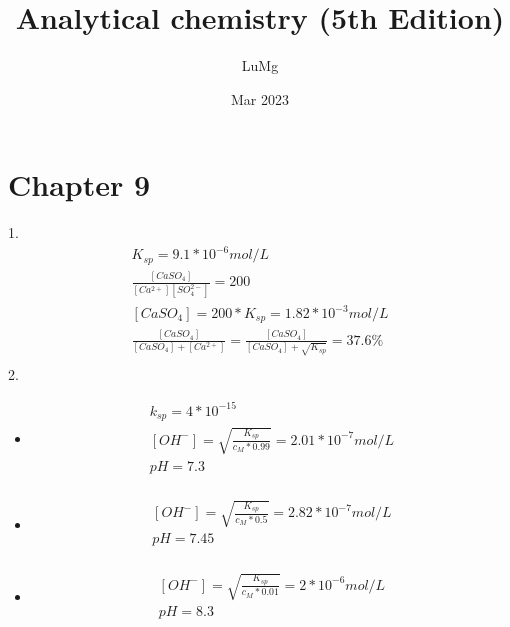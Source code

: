 \documentclass{article}
\title{Analytical chemistry (5th Edition)}
\author{LuMg}
\date{Mar 2023}
\begin{document}
\maketitle

\section{Chapter 9}
1.\begin{equation}
    \begin{multlined}
        K_{sp} = 9.1*10^{-6} mol/L\\
        \frac{[CaSO_4]}{[Ca^{2+}][SO_4^{2-}]} = 200\\
        [CaSO_4] = 200*K_{sp} = 1.82*10^{-3} mol/L\\
        \frac{[CaSO_4]}{[CaSO_4]+[Ca^{2+}]} = \frac{[CaSO_4]}{[CaSO_4] + \sqrt{K_{sp}}} = 37.6\%\\
    \end{multlined}
\end{equation}
2.\begin{itemize}
    \item
    \begin{equation}
        \begin{multlined}
            k_{sp} = 4*10^{-15}\\
            [OH^-]=\sqrt{\frac{K_{sp}}{c_M*0.99}} = 2.01*10^{-7} mol/L\\
            pH = 7.3\\
        \end{multlined}
    \end{equation}
    \item
    \begin{equation}
        \begin{multlined}
            [OH^-] = \sqrt{\frac{K_{sp}}{c_M*0.5}} = 2.82*10^{-7} mol/L\\
            pH = 7.45\\
        \end{multlined}
    \end{equation}
    \item
    \begin{equation}
        \begin{multlined}
            [OH^-] = \sqrt{\frac{K_{sp}}{c_M*0.01}} = 2*10^{-6}mol/L\\
            pH = 8.3\\
        \end{multlined}
    \end{equation}
\end{itemize}
\end{document}
